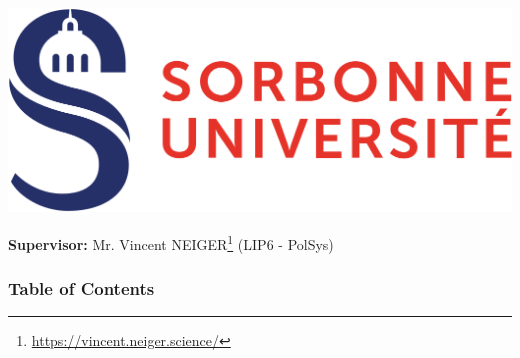 \documentclass[10pt]{beamer}
\begin{document}
\begin{frame}[plain]
	\begin{center} 
		\includegraphics[scale=0.1]{su.png}
    \end{center}

    \titlepage
    
    \vfill
    \begin{flushleft}
        {\small
            \textbf{Supervisor:} Mr. Vincent NEIGER\footnote{\url{https://vincent.neiger.science/}} (LIP6 - PolSys)\\
        }
    \end{flushleft}
\end{frame}

\begin{frame}
    \frametitle{Table of Contents}
    \tableofcontents
\end{frame}
\end{document}
